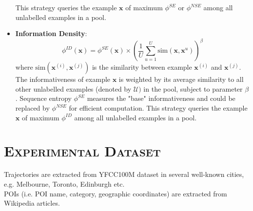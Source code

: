 \documentclass[11pt, a4paper]{article}
\begin{document}
\begin{itemize}
      This strategy queries the example $\textbf{x}$ of maximum $\phi^{SE}$ or $\phi^{NSE}$ among all unlabelled examples in a pool.
\item \textbf{Information Density}\cite{settles08}:
      \begin{equation*}
      \phi^{ID}(\textbf{x}) = \phi^{SE}(\textbf{x}) \times 
        \left(
        \frac{1}{U} \sum_{u=1}^U \text{sim}(\textbf{x}, \textbf{x}^u)
        \right)^\beta
      \end{equation*}
      where $\text{sim}(\textbf{x}^{(i)}, \textbf{x}^{(j)})$ is the similarity between example $\textbf{x}^{(i)}$ and $\textbf{x}^{(j)}$.
      The informativeness of example $\textbf{x}$ is weighted by its average similarity 
      to all other unlabelled examples (denoted by $\mathcal{U})$ in the pool, subject to parameter $\beta$.
      Sequence entropy $\phi^{SE}$ measures the "base" informativeness and could be replaced by $\phi^{NSE}$ for efficient computation.
      This strategy queries the example $\textbf{x}$ of maximum $\phi^{ID}$ among all unlabelled examples in a pool.
\end{itemize}

\section{\textsc{Experimental Dataset}}
Trajectories are extracted from YFCC100M dataset in several well-known cities, e.g. Melbourne, Toronto, Edinburgh etc. \\
POIs (i.e. POI name, category, geographic coordinates) are extracted from Wikipedia articles.




\end{document}
